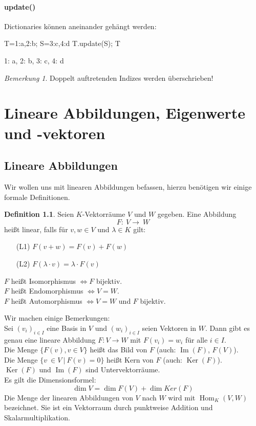 \documentclass[fontsize=12pt,paper=a4,twoside,bibtotoc,idxtotoc,
liststotoc,pagesize,BCOR1.2cm,DIV15,chapterprefix,pagesize=pdftex]{scrbook}
\theoremstyle{plain}
\theoremstyle{definition}
\newtheorem{df}[equation]{Definition}
\theoremstyle{remark}
\newtheorem{bem}[equation]{Bemerkung}
\begin{document}
\subsubsection{update()}
Dictionaries können aneinander gehängt werden:
\begin{sagein}
T={1:a,2:b}; S={3:c,4:d}
T.update(S); T
\end{sagein}
\begin{sage}
{1: a, 2: b, 3: c, 4: d}
\end{sage}
\begin{bem}
Doppelt auftretenden Indizes werden überschrieben!
\end{bem}

\chapter{Lineare Abbildungen, Eigenwerte und -vektoren}
\section{Lineare Abbildungen}
Wir wollen uns mit linearen Abbildungen befassen, hierzu benötigen wir einige formale Definitionen.
\begin{df}
Seien $K$-Vektorräume $V$ und $W$ gegeben. Eine Abbildung
\[ F: \ V \rightarrow \ W \]
heißt linear, falls für $v,w\in V$ und $\lambda \in K$ gilt:
\begin{itemize}
 \item[(L1)] $F(v+w)=F(v)+F(w)$
 \item[(L2)] $F(\lambda \cdot v)=\lambda \cdot F(v)$
\end{itemize} 
$F$ heißt Isomorphismus $\Longleftrightarrow F$ bijektiv.\\
$F$ heißt Endomorphismus $\Longleftrightarrow V=W$.\\
$F$ heißt Automorphismus $\Longleftrightarrow V=W$ und $F$ bijektiv.
\end{df}
Wir machen einige Bemerkungen:\\
Sei $(v_i)_{i\in I}$ eine Basis in $V$ und $(w_i)_{i\in I}$
seien Vektoren in $W$. Dann gibt es genau eine lineare Abbildung $F:V
\rightarrow W$ mit $F(v_i)=w_i$ für alle $i \in I$.\\
Die Menge $\{ F(v), v \in V \}$ heißt das Bild von $F$ (auch: $\mathop{Im}(F)$, $F(V)$).\\
Die Menge $\{v \ \in V \ | \ F(v)=0 \}$ heißt Kern von $F$ (auch: $\mathop{Ker}(F)$).\\
$\mathop{Ker}(F)$ und $\mathop{Im}(F)$ sind Untervektorräume.\\
Es gilt die Dimensionsformel:
\[\dim V = \dim F(V) + \dim Ker(F)\]
Die Menge der linearen Abbildungen von $V$ nach $W$ wird mit $\operatorname{Hom}_K(V,W)$ bezeichnet. 
Sie ist ein Vektorraum durch punktweise Addition und Skalarmultiplikation.
\end{document}
